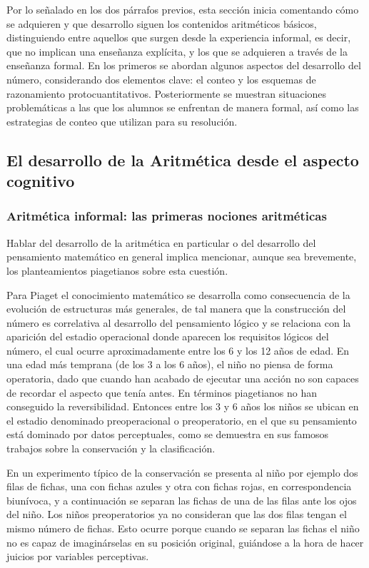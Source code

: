 \documentclass{article}
\begin{document}
Por lo señalado en los dos párrafos previos, esta sección inicia comentando cómo se adquieren y que desarrollo siguen los contenidos aritméticos básicos, distinguiendo entre aquellos que surgen desde la experiencia informal, es decir, que no implican una enseñanza explícita, y los que se adquieren a través de la enseñanza formal. En los primeros se abordan algunos aspectos del desarrollo del número, considerando dos elementos clave: el conteo y los esquemas de razonamiento protocuantitativos. Posteriormente se muestran situaciones problemáticas a las que los alumnos se enfrentan de manera formal, así como las estrategias de conteo que utilizan para su resolución.
\subsection{El desarrollo de la Aritmética desde el aspecto cognitivo}
\subsubsection{Aritmética informal: las primeras nociones aritméticas}
Hablar del desarrollo de la aritmética en particular o del desarrollo del pensamiento matemático en general implica mencionar, aunque sea brevemente, los planteamientos piagetianos sobre esta cuestión.

Para Piaget \cite{piaget2015psicologia} el conocimiento matemático se desarrolla como consecuencia de la evolución de estructuras más generales, de tal manera que la construcción del número es correlativa al desarrollo del pensamiento lógico y se relaciona con la aparición del estadio operacional donde aparecen los requisitos lógicos del número, el cual ocurre aproximadamente entre los 6 y los 12 años de edad. En una edad más temprana (de los 3 a los 6 años), el niño no piensa de forma operatoria, dado que cuando han acabado de ejecutar una acción no son capaces de recordar el aspecto que tenía antes. En términos piagetianos no han conseguido la reversibilidad. Entonces entre los 3 y 6 años los niños se ubican en el estadio denominado preoperacional o preoperatorio, en el que su pensamiento está dominado por datos perceptuales, como se demuestra en sus famosos trabajos sobre la conservación y la clasificación. 

En un experimento típico de la conservación se presenta al niño por ejemplo dos filas de fichas, una con fichas azules y otra con fichas rojas, en correspondencia biunívoca, y a continuación se separan las fichas de una de las filas ante los ojos del niño. Los niños preoperatorios ya no consideran que las dos filas tengan el mismo número de fichas. Esto ocurre porque cuando se separan las fichas el niño no es capaz de imaginárselas en su posición original, guiándose a la hora de hacer juicios por variables perceptivas.
\end{document}
